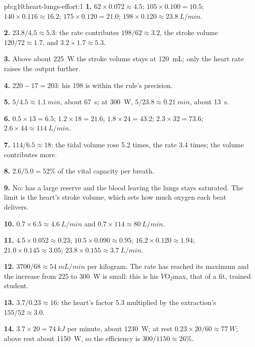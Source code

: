 \begin{solution}{pb:g10:heart-lungs-effort:1}
\textbf{1.} $62 \times 0.072 \approx 4.5$; $105 \times 0.100 = 10.5$;
$140 \times 0.116 \approx 16.2$; $175 \times 0.120 = 21.0$;
$198 \times 0.120 \approx \qty{23.8}{L/min}$.

\textbf{2.} $23.8/4.5 \approx 5.3$: the rate contributes $198/62
\approx 3.2$, the stroke volume $120/72 \approx 1.7$, and $3.2 \times
1.7 \approx 5.3$.

\textbf{3.} Above about \qty{225}{W} the stroke volume stays at
\qty{120}{mL}; only the heart rate raises the output further.

\textbf{4.} $220 - 17 = 203$: his 198 is within the rule's precision.

\textbf{5.} $5/4.5 \approx \qty{1.1}{min}$, about \qty{67}{s}; at
\qty{300}{W}, $5/23.8 \approx \qty{0.21}{min}$, about \qty{13}{s}.

\textbf{6.} $0.5 \times 13 = 6.5$; $1.2 \times 18 = 21.6$; $1.8 \times
24 = 43.2$; $2.3 \times 32 = 73.6$; $2.6 \times 44 \approx
\qty{114}{L/min}$.

\textbf{7.} $114/6.5 \approx 18$: the tidal volume rose 5.2 times, the
rate 3.4 times; the volume contributes more.

\textbf{8.} $2.6/5.0 = 52\%$ of the vital capacity per breath.

\textbf{9.} No:  has a large reserve and the blood leaving
the lungs stays saturated. The limit is the heart's stroke volume,
which sets how much oxygen each beat delivers.

\textbf{10.} $0.7 \times 6.5 \approx \qty{4.6}{L/min}$ and $0.7 \times
114 \approx \qty{80}{L/min}$.

\textbf{11.} $4.5 \times 0.052 \approx 0.23$; $10.5 \times 0.090
\approx 0.95$; $16.2 \times 0.120 \approx 1.94$; $21.0 \times 0.145
\approx 3.05$; $23.8 \times 0.155 \approx \qty{3.7}{L/min}$.

\textbf{12.} $3700/68 \approx \qty{54}{mL/min}$ per kilogram. The rate
has reached its maximum and the increase from 225 to \qty{300}{W} is
small: this is his $\dot V\!\mathrm{O_2}$max, that of a fit, trained
student.

\textbf{13.} $3.7/0.23 \approx 16$: the heart's factor 5.3 multiplied
by the extraction's $155/52 \approx 3.0$.

\textbf{14.} $3.7 \times 20 = \qty{74}{kJ}$ per minute, about
\qty{1230}{W}; at rest $0.23 \times 20/60 \approx \qty{77}{W}$; above
rest about \qty{1150}{W}, so the efficiency is $300/1150 \approx
26\%$.


\end{solution}
